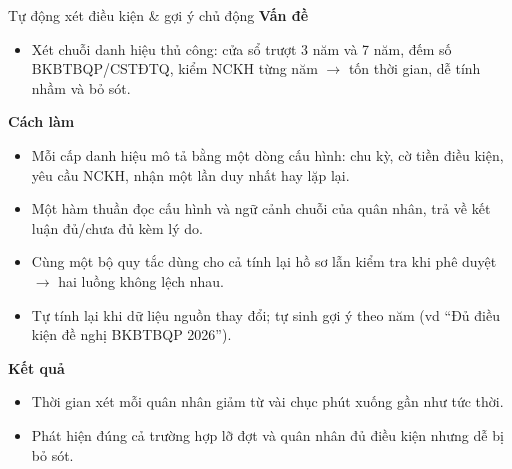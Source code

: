 \documentclass[aspectratio=43,xcolor=table]{beamer}
\begin{document}
\begin{frame}{Tự động xét điều kiện \& gợi ý chủ động}
  \footnotesize
  \textbf{\textcolor{hustred}{Vấn đề}}
  \begin{itemize}\scriptsize
    \item Xét chuỗi danh hiệu thủ công: cửa sổ trượt 3 năm và 7 năm, đếm số BKBTBQP/CSTĐTQ, kiểm NCKH từng năm $\to$ tốn thời gian, dễ tính nhầm và bỏ sót.
  \end{itemize}

  \textbf{\textcolor{hustred}{Cách làm}}
  \begin{itemize}\scriptsize
    \item Mỗi cấp danh hiệu mô tả bằng một dòng cấu hình: chu kỳ, cờ tiền điều kiện, yêu cầu NCKH, nhận một lần duy nhất hay lặp lại.
    \item Một hàm thuần đọc cấu hình và ngữ cảnh chuỗi của quân nhân, trả về kết luận đủ/chưa đủ kèm lý do.
    \item Cùng một bộ quy tắc dùng cho cả tính lại hồ sơ lẫn kiểm tra khi phê duyệt $\to$ hai luồng không lệch nhau.
    \item Tự tính lại khi dữ liệu nguồn thay đổi; tự sinh gợi ý theo năm (vd ``Đủ điều kiện đề nghị BKBTBQP 2026'').
  \end{itemize}

  \textbf{\textcolor{hustred}{Kết quả}}
  \begin{itemize}\scriptsize
    \item Thời gian xét mỗi quân nhân giảm từ vài chục phút xuống gần như tức thời.
    \item Phát hiện đúng cả trường hợp lỡ đợt và quân nhân đủ điều kiện nhưng dễ bị bỏ sót.
  \end{itemize}
\end{frame}
\end{document}
